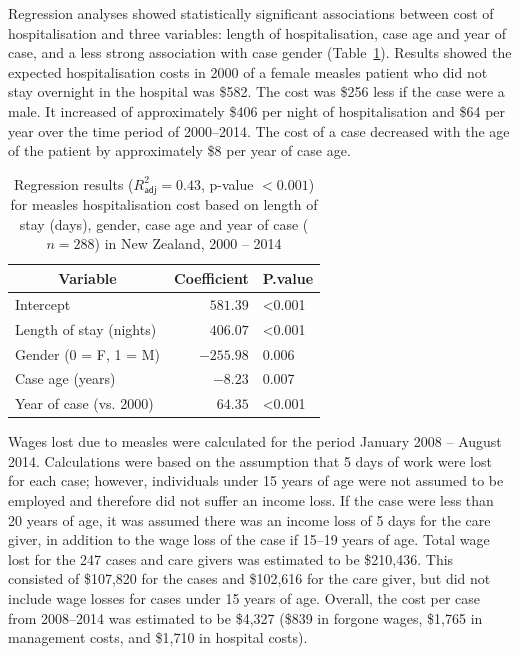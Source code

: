 \documentclass{article}
\begin{document}
\begin{itemize}
Regression analyses showed statistically significant associations between cost of hospitalisation and three variables: length of hospitalisation, case age and year of case, and a less strong association with case gender (Table~\ref{table:regression}). Results showed the expected hospitalisation costs in 2000 of a female measles patient who did not stay overnight in the hospital was \$582.  The cost was \$256 less if the case were a male. It increased of approximately \$406 per night of hospitalisation and \$64 per year over the time period of 2000--2014. The cost of a case decreased with the age of the patient by approximately \$8 per year of case age.


\begin{table}
\caption{Regression results ($R^{2}_\textsf{adj} = 0.43$, p-value $<0.001$) for measles hospitalisation cost based on length of stay (days), gender, case age and year of case ($n=288$) in New Zealand, 2000 -- 2014}
\begin{center}
\begin{tabular}{lrl}
\hline\hline
\multicolumn{1}{c}{Variable}&\multicolumn{1}{c}{Coefficient}&\multicolumn{1}{c}{P.value}\tabularnewline
\hline
Intercept&$ 581.39$&\textless  0.001\tabularnewline
Length of stay (nights)&$ 406.07$&\textless  0.001\tabularnewline
Gender (0 = F, 1 = M)&$-255.98$&0.006\tabularnewline
Case age (years)&$  -8.23$&0.007\tabularnewline
Year of case (vs. 2000)&$  64.35$&\textless  0.001\tabularnewline
\hline
\end{tabular}\end{center}\label{table:regression}
\end{table}

Wages lost due to measles were calculated for the period January 2008 -- August 2014. Calculations were based on the assumption that 5 days of work were lost for each case; however, individuals under 15 years of age were not assumed to be employed and therefore did not suffer an income loss. If the case were less than 20 years of age, it was assumed there was an income loss of 5 days for the care giver, in addition to the wage loss of the case if 15--19 years of age. Total wage lost for the 247 cases and care givers was estimated to be \$210,436. This consisted of \$107,820 for the cases and \$102,616 for the care giver, but did not include wage losses for cases under 15 years of age. Overall, the cost per case from 2008--2014 was estimated to be \$4,327 (\$839 in forgone wages, \$1,765 in management costs, and \$1,710 in hospital costs).


\end{itemize}
\end{document}

